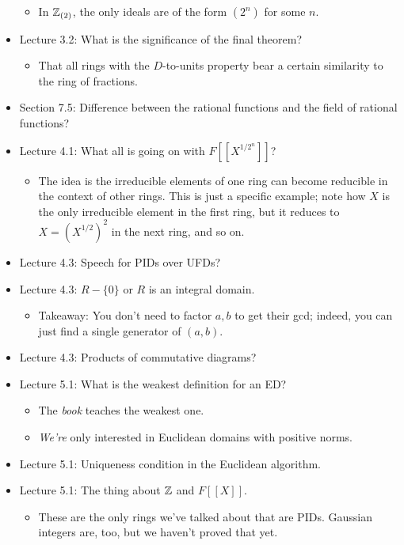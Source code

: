 \documentclass[../notes.tex]{subfiles}
\begin{document}
\begin{itemize}
    \begin{itemize}
        \item In $\mathbb{Z}_{(2)}$, the only ideals are of the form $(2^n)$ for some $n$.
    \end{itemize}
    \item Lecture 3.2: What is the significance of the final theorem?
    \begin{itemize}
        \item That all rings with the $D$-to-units property bear a certain similarity to the ring of fractions.
    \end{itemize}
    \item Section 7.5: Difference between the rational functions and the field of rational functions?
    \item Lecture 4.1: What all is going on with $F[[X^{1/2^n}]]$?
    \begin{itemize}
        \item The idea is the irreducible elements of one ring can become reducible in the context of other rings. This is just a specific example; note how $X$ is the only irreducible element in the first ring, but it reduces to $X=(X^{1/2})^2$ in the next ring, and so on.
    \end{itemize}
    \item Lecture 4.3: Speech for PIDs over UFDs?
    \item Lecture 4.3: $R-\{0\}$ or $R$ is an integral domain.
    \begin{itemize}
        \item Takeaway: You don't need to factor $a,b$ to get their gcd; indeed, you can just find a single generator of $(a,b)$.
    \end{itemize}
    \item Lecture 4.3: Products of commutative diagrams?
    \item Lecture 5.1: What is the weakest definition for an ED?
    \begin{itemize}
        \item The \emph{book} teaches the weakest one.
        \item \emph{We're} only interested in Euclidean domains with positive norms.
    \end{itemize}
    \item Lecture 5.1: Uniqueness condition in the Euclidean algorithm.
    \item Lecture 5.1: The thing about $\mathbb{Z}$ and $F[[X]]$.
    \begin{itemize}
        \item These are the only rings we've talked about that are PIDs. Gaussian integers are, too, but we haven't proved that yet.

\end{itemize}
\end{itemize}
\end{document}
